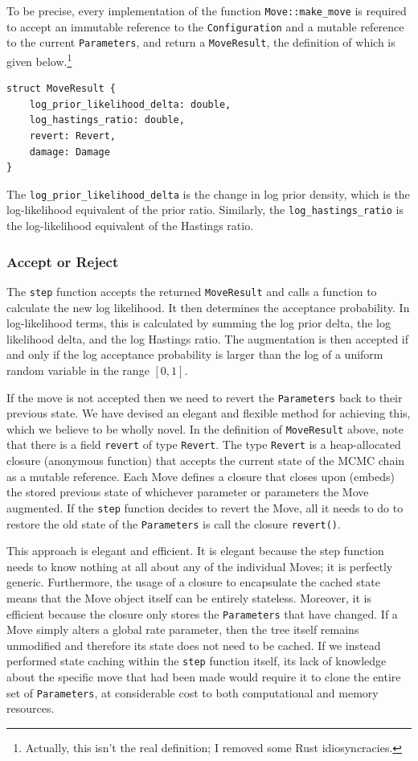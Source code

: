 \documentclass[10pt,journal,compsoc]{IEEEtran}
\begin{document}
To be precise, every implementation of the function \texttt{Move::make\_move} is required to accept an immutable reference to the \texttt{Configuration} and a mutable reference to the current \texttt{Parameters}, and return a \texttt{MoveResult}, the definition of which is given below.\footnote{Actually, this isn't the real definition; I removed some Rust idiosyncracies.}

\begin{verbatim}
struct MoveResult {
    log_prior_likelihood_delta: double,
    log_hastings_ratio: double,
    revert: Revert,
    damage: Damage
}
\end{verbatim}

The \texttt{log\_prior\_likelihood\_delta} is the change in log prior density, which is the log-likelihood equivalent of the prior ratio. Similarly, the \texttt{log\_hastings\_ratio} is the log-likelihood equivalent of the Hastings ratio.

\subsubsection{Accept or Reject}

The \texttt{step} function accepts the returned \texttt{MoveResult} and calls a function to calculate the new log likelihood. It then determines the acceptance probability. In log-likelihood terms, this is calculated by summing the log prior delta, the log likelihood delta, and the log Hastings ratio. The augmentation is then accepted if and only if the log acceptance probability is larger than the log of a uniform random variable in the range $[0, 1]$.

If the move is not accepted then we need to revert the \texttt{Parameters} back to their previous state. We have devised an elegant and flexible method for achieving this, which we believe to be wholly novel. In the definition of \texttt{MoveResult} above, note that there is a field \texttt{revert} of type \texttt{Revert}. The type \texttt{Revert} is a heap-allocated closure (anonymous function) that accepts the current state of the MCMC chain as a mutable reference. Each Move defines a closure that closes upon (embeds) the stored previous state of whichever parameter or parameters the Move augmented. If the \texttt{step} function decides to revert the Move, all it needs to do to restore the old state of the \texttt{Parameters} is call the closure \texttt{revert()}.

This approach is elegant and efficient. It is elegant because the step function needs to know nothing at all about any of the individual Moves; it is perfectly generic. Furthermore, the usage of a closure to encapsulate the cached state means that the Move object itself can be entirely stateless. Moreover, it is efficient because the closure only stores the \texttt{Parameters} that have changed. If a Move simply alters a global rate parameter, then the tree itself remains unmodified and therefore its state does not need to be cached. If we instead performed state caching within the \texttt{step} function itself, its lack of knowledge about the specific move that had been made would require it to clone the entire set of \texttt{Parameters}, at considerable cost to both computational and memory resources. 
\end{document}
